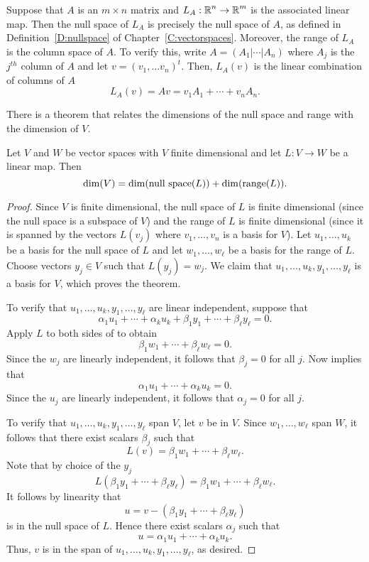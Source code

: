 \documentclass{ximera}
\begin{document}
Suppose that $A$ is an $m\times n$ matrix and $L_A:\mbox{$\Bbb{R}$}^n\to\mbox{$\Bbb{R}$}^m$ is the
associated linear map.  Then the null space of $L_A$ is precisely the null
space of $A$, as defined in Definition~\ref{D:nullspace} of 
Chapter~\ref{C:vectorspaces}.  Moreover, the range of $L_A$ is the column 
space of $A$.  To verify this, write $A=(A_1|\cdots|A_n)$ where $A_j$ is the 
$j^{th}$ column of $A$ and let $v=(v_1,\ldots v_n)^t$.  Then, $L_A(v)$ is the 
linear combination of columns of $A$
\[
L_A(v)=Av = v_1A_1+\cdots+v_nA_n.
\]

There is a theorem that relates the dimensions of the null space and range
with the dimension of $V$.
\begin{theorem}  \label{T:nsr}
Let $V$ and $W$ be vector spaces with $V$ finite dimensional and let
$L:V\to W$ be a linear map.  Then
\[
\dim(V) = \dim(\mbox{\rm null space}(L)) + \dim({\rm range}(L)).
\] 
\end{theorem}

\begin{proof}   Since $V$ is finite dimensional, the null space of $L$ is finite 
dimensional (since the null space is a subspace of $V$) and the range of $L$ 
is finite dimensional (since it is spanned by the vectors $L(v_j)$ where 
$v_1,\ldots,v_n$ is a basis for $V$).  Let $u_1,\ldots,u_k$ be a basis for 
the null space of $L$ and let $w_1,\ldots,w_\ell$ be a basis for the range of
$L$.   Choose vectors $y_j\in V$ such that $L(y_j)=w_j$.  We claim that
$u_1,\ldots,u_k,y_1,\ldots,y_\ell$ is a basis for $V$, which proves the
theorem.

To verify that $u_1,\ldots,u_k,y_1,\ldots,y_\ell$ are linear independent,
suppose that
\begin{equation}  \label{E:uy}
\alpha_1u_1+\cdots+\alpha_ku_k+\beta_1y_1+\cdots+\beta_\ell y_\ell = 0.
\end{equation}
Apply $L$ to both sides of  to obtain
\[
\beta_1w_1+\cdots+\beta_\ell w_\ell = 0.
\]
Since the $w_j$ are linearly independent, it follows that $\beta_j=0$ for all
$j$.  Now   implies that
\[
\alpha_1u_1+\cdots+\alpha_ku_k = 0.
\]
Since the $u_j$ are linearly independent, it follows that $\alpha_j=0$ for
all $j$.

To verify that $u_1,\ldots,u_k,y_1,\ldots,y_\ell$ span $V$, let $v$ be in
$V$.  Since $w_1,\ldots,w_\ell$ span $W$, it follows that there exist scalars
$\beta_j$ such that
\[
L(v) = \beta_1w_1+\cdots+\beta_\ell w_\ell.
\]
Note that by choice of the $y_j$
\[
L(\beta_1y_1+\cdots+\beta_\ell y_\ell) = \beta_1w_1+\cdots+\beta_\ell w_\ell.
\]
It follows by linearity that
\[
u = v - (\beta_1y_1+\cdots+\beta_\ell y_\ell)
\]
is in the null space of $L$.  Hence there exist scalars $\alpha_j$ such that
\[
u = \alpha_1u_1+\cdots+\alpha_ku_k.
\]
Thus, $v$ is in the span of $u_1,\ldots,u_k,y_1,\ldots,y_\ell$, as desired.
\end{proof}
\end{document}
